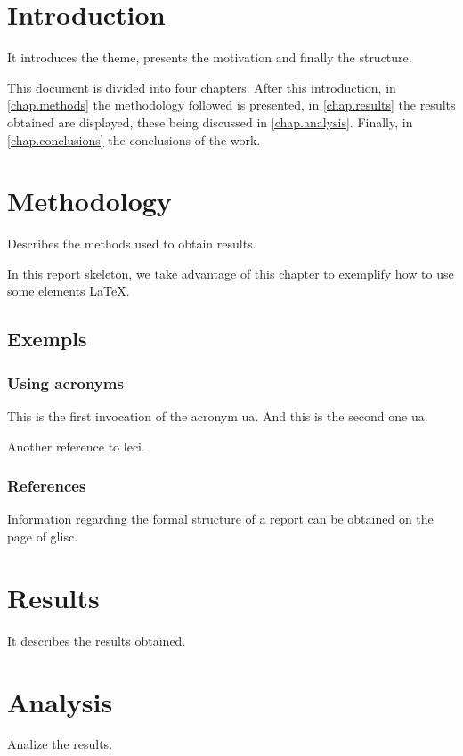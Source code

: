 \documentclass{report}
\begin{document}
\clearpage
{}

\chapter{Introduction}
\label{chap.intro}

It introduces the theme, presents the motivation and finally the structure.

This document is divided into four chapters.
After this introduction,
in \autoref{chap.methods} the methodology followed is presented,
in \autoref{chap.results} the results obtained are displayed,
these being discussed in \autoref{chap.analysis}.
Finally, in \autoref{chap.conclusions}
the conclusions of the work.

\chapter{Methodology}
\label{chap.methods}
Describes the methods used to obtain results.

In this report skeleton, we take advantage of this chapter to exemplify
how to use some elements {\LaTeX}.

\section{Exempls}

\subsection{Using acronyms}
This is the first invocation of the acronym \ac{ua}.
And this is the second one \ac{ua}.

Another reference to \ac{leci}.

\subsection{References}
Information regarding the formal structure of a report can be obtained
on the page of \ac{glisc}\cite{glisc}.

\chapter{Results}
\label{chap.results}
It describes the results obtained.

\chapter{Analysis}
\label{chap.analysis}
Analize the results.
\end{document}
